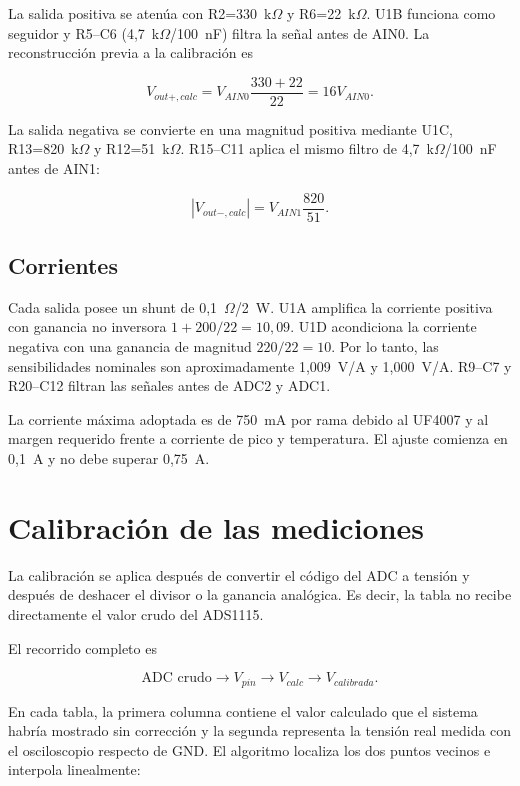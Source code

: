 \documentclass[conference]{IEEEtran}
\begin{document}
La salida positiva se atenúa con R2=330~k$\Omega$ y R6=22~k$\Omega$. U1B funciona como seguidor y R5--C6 (4,7~k$\Omega$/100~nF) filtra la señal antes de AIN0. La reconstrucción previa a la calibración es

\begin{equation}
V_{out+,calc}=V_{AIN0}\frac{330+22}{22}=16V_{AIN0}.
\end{equation}

La salida negativa se convierte en una magnitud positiva mediante U1C, R13=820~k$\Omega$ y R12=51~k$\Omega$. R15--C11 aplica el mismo filtro de 4,7~k$\Omega$/100~nF antes de AIN1:

\begin{equation}
|V_{out-,calc}|=V_{AIN1}\frac{820}{51}.
\end{equation}

\subsection{Corrientes}

Cada salida posee un shunt de 0,1~$\Omega$/2~W. U1A amplifica la corriente positiva con ganancia no inversora $1+200/22=10,09$. U1D acondiciona la corriente negativa con una ganancia de magnitud $220/22=10$. Por lo tanto, las sensibilidades nominales son aproximadamente 1,009~V/A y 1,000~V/A. R9--C7 y R20--C12 filtran las señales antes de ADC2 y ADC1.

La corriente máxima adoptada es de 750~mA por rama debido al UF4007 y al margen requerido frente a corriente de pico y temperatura. El ajuste comienza en 0,1~A y no debe superar 0,75~A.

\section{Calibración de las mediciones}

La calibración se aplica después de convertir el código del ADC a tensión y después de deshacer el divisor o la ganancia analógica. Es decir, la tabla no recibe directamente el valor crudo del ADS1115.

El recorrido completo es

\begin{equation}
\text{ADC crudo}\rightarrow V_{pin}\rightarrow V_{calc}\rightarrow V_{calibrada}.
\end{equation}

En cada tabla, la primera columna contiene el valor calculado que el sistema habría mostrado sin corrección y la segunda representa la tensión real medida con el osciloscopio respecto de GND. El algoritmo localiza los dos puntos vecinos e interpola linealmente:
\end{document}
